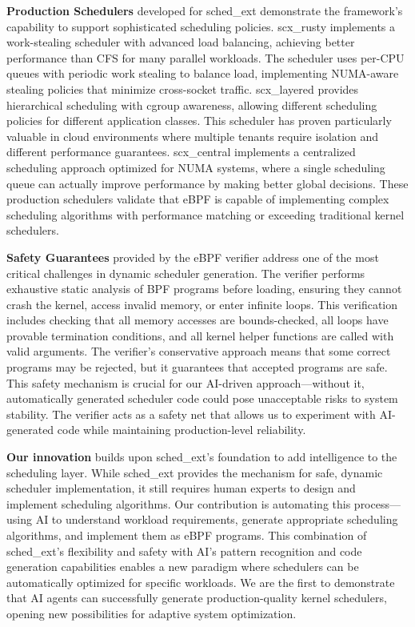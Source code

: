 \textbf{Production Schedulers} developed for sched\_ext demonstrate the framework's capability to support sophisticated scheduling policies. scx\_rusty implements a work-stealing scheduler with advanced load balancing, achieving better performance than CFS for many parallel workloads. The scheduler uses per-CPU queues with periodic work stealing to balance load, implementing NUMA-aware stealing policies that minimize cross-socket traffic. scx\_layered provides hierarchical scheduling with cgroup awareness, allowing different scheduling policies for different application classes. This scheduler has proven particularly valuable in cloud environments where multiple tenants require isolation and different performance guarantees. scx\_central implements a centralized scheduling approach optimized for NUMA systems, where a single scheduling queue can actually improve performance by making better global decisions. These production schedulers validate that eBPF is capable of implementing complex scheduling algorithms with performance matching or exceeding traditional kernel schedulers.

\textbf{Safety Guarantees} provided by the eBPF verifier address one of the most critical challenges in dynamic scheduler generation. The verifier performs exhaustive static analysis of BPF programs before loading, ensuring they cannot crash the kernel, access invalid memory, or enter infinite loops. This verification includes checking that all memory accesses are bounds-checked, all loops have provable termination conditions, and all kernel helper functions are called with valid arguments. The verifier's conservative approach means that some correct programs may be rejected, but it guarantees that accepted programs are safe. This safety mechanism is crucial for our AI-driven approach—without it, automatically generated scheduler code could pose unacceptable risks to system stability. The verifier acts as a safety net that allows us to experiment with AI-generated code while maintaining production-level reliability.

\textbf{Our innovation} builds upon sched\_ext's foundation to add intelligence to the scheduling layer. While sched\_ext provides the mechanism for safe, dynamic scheduler implementation, it still requires human experts to design and implement scheduling algorithms. Our contribution is automating this process—using AI to understand workload requirements, generate appropriate scheduling algorithms, and implement them as eBPF programs. This combination of sched\_ext's flexibility and safety with AI's pattern recognition and code generation capabilities enables a new paradigm where schedulers can be automatically optimized for specific workloads. We are the first to demonstrate that AI agents can successfully generate production-quality kernel schedulers, opening new possibilities for adaptive system optimization.

